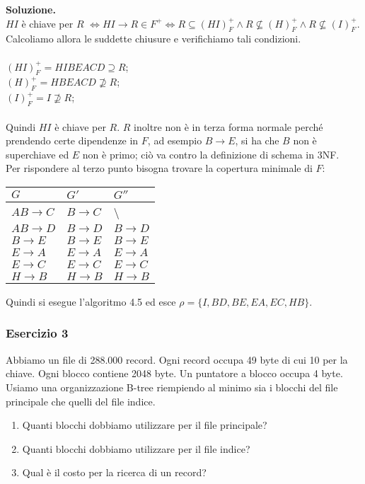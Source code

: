  \noindent\textbf{\fontsize{14pt}{1em}Soluzione.}\\
 $HI$ è chiave per $R$ $\Leftrightarrow HI \rightarrow R\in F^+ \Leftrightarrow R \subseteq (HI)^+_F \wedge
 R \not\subseteq (H)^+_F \wedge R \not\subseteq (I)^+_F$. Calcoliamo allora le suddette chiusure 
 e verifichiamo tali condizioni.\\\\
 $(HI)^+_F = HIBEACD \supseteq R$;\\
 $(H)^+_F = HBEACD \not\supseteq R$;\\
 $(I)^+_F = I \not\supseteq R$;\\\\
Quindi $HI$ è chiave per $R$. $R$ inoltre non è in terza forma normale perché prendendo certe dipendenze in $F$, ad esempio 
$B \rightarrow E$, si ha che $B$ non è superchiave ed $E$ non è primo; ciò va contro la definizione di schema in 3NF.\\
Per rispondere al terzo punto bisogna trovare la copertura minimale di $F$:
\begin{center}
 \begin{tabular}{l|l|l}
  $G$ & $G'$ & $G''$\\
  \hline
  $AB\rightarrow C$ & $B\rightarrow C$ & \textbackslash \\
  $AB \rightarrow D$ & $B \rightarrow D$ & $B \rightarrow D$\\
  $B \rightarrow E$ & $B \rightarrow E$ & $B \rightarrow E$\\ 
  $E \rightarrow A$ & $E \rightarrow A$ & $E \rightarrow A$\\
  $E \rightarrow C$ & $E \rightarrow C$ & $E \rightarrow C$\\
  $H \rightarrow B$ & $H \rightarrow B$ & $H \rightarrow B$\\ 
 \end{tabular}
\end{center}
Quindi si esegue l'algoritmo 4.5 ed esce $\rho= \{I, BD, BE, EA, EC, HB\}$.

\subsubsection{Esercizio 3}
Abbiamo un file di 288.000 record. Ogni record occupa 49 byte di cui 10 per la chiave. Ogni blocco contiene 2048 byte. 
Un puntatore a blocco occupa 4 byte. Usiamo una organizzazione B-tree riempiendo al minimo sia i blocchi del file 
principale che quelli del file indice.
\begin{enumerate}
 \item Quanti blocchi dobbiamo utilizzare per il file principale? 
 \item Quanti blocchi dobbiamo utilizzare per il file indice?
 \item Qual è il costo per la ricerca di un record? 
\end{enumerate}

